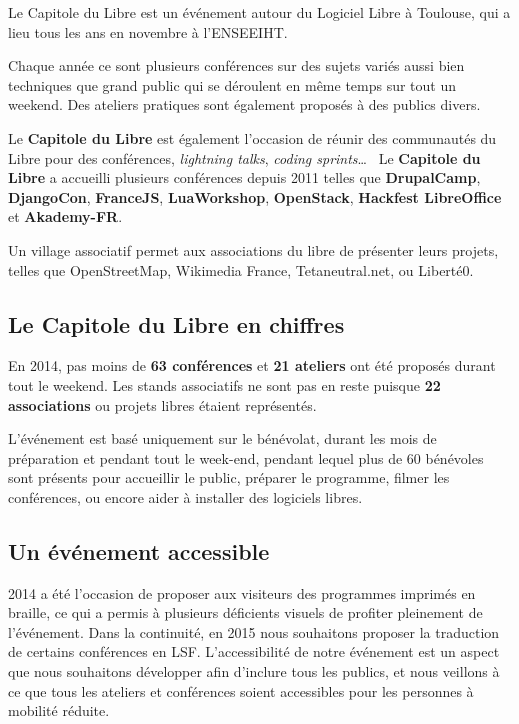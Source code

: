 
Le Capitole du Libre est un événement autour du Logiciel Libre à 
Toulouse, qui a lieu tous les ans en novembre à l'ENSEEIHT.

Chaque année ce sont plusieurs conférences sur des sujets variés 
aussi bien techniques que grand public qui se déroulent en même temps 
sur tout un weekend. Des ateliers pratiques sont également proposés 
à des publics divers.

\Separateur

Le \textbf{Capitole du Libre} est également l'occasion de réunir des 
communautés du Libre pour des conférences, \textit{lightning talks}, 
\textit{coding sprints}\dots ~ Le \textbf{Capitole du Libre} a 
accueilli plusieurs conférences depuis 2011 telles que 
\textbf{DrupalCamp}, \textbf{DjangoCon},  \textbf{FranceJS}, 
\textbf{LuaWorkshop}, \textbf{OpenStack}, \textbf{Hackfest LibreOffice} 
et \textbf{Akademy-FR}.

\Separateur

Un village associatif permet aux associations du libre de présenter 
leurs projets, telles que OpenStreetMap, Wikimedia France, 
Tetaneutral.net, ou Liberté0.

\subsection{Le Capitole du Libre en chiffres}

En 2014, pas moins de \textbf{63 conférences} et \textbf{21 ateliers} 
ont été proposés durant tout le weekend. Les stands associatifs ne 
sont pas en reste puisque \textbf{22 associations} ou projets libres 
étaient représentés.

\Separateur

L'événement est basé uniquement sur le bénévolat, durant les mois 
de préparation et pendant tout le week-end, pendant lequel plus de 60 
bénévoles sont présents pour accueillir le public, préparer le 
programme, filmer les conférences, ou encore aider à installer des 
logiciels libres.

\subsection{Un événement accessible}

\begin{minipage}{0.38\textwidth}
\begin{center}
\end{center}
\end{minipage}
\begin{minipage}{0.62\textwidth}
2014 a été l'occasion de proposer aux visiteurs des programmes 
imprimés en braille, ce qui a permis à plusieurs déficients visuels 
de profiter pleinement de l'événement. Dans la continuité, en 2015 
nous souhaitons proposer la traduction de certains conférences en LSF.
\Separateur
L'accessibilité de notre événement est un aspect que nous souhaitons 
développer afin d'inclure tous les publics, et nous veillons à ce que 
tous les ateliers et conférences soient accessibles pour les personnes 
à mobilité réduite.
\end{minipage}


